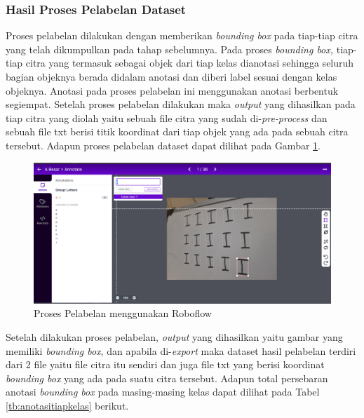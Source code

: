 \subsubsection{Hasil Proses Pelabelan Dataset}
\label{subsubsec:hasilpelabelan}

Proses pelabelan dilakukan dengan memberikan \textit{bounding box} pada tiap-tiap citra yang telah dikumpulkan pada tahap sebelumnya. Pada proses \textit{bounding box,} tiap-tiap citra yang termasuk sebagai objek dari tiap kelas dianotasi sehingga seluruh bagian objeknya berada didalam anotasi dan diberi label sesuai dengan kelas objeknya. Anotasi pada proses pelabelan ini menggunakan anotasi berbentuk segiempat. Setelah proses pelabelan dilakukan maka \textit{output} yang dihasilkan pada tiap citra yang diolah yaitu sebuah file citra yang sudah di-\textit{pre-process} dan sebuah file txt berisi titik koordinat dari tiap objek yang ada pada sebuah citra tersebut. Adapun proses pelabelan dataset dapat dilihat pada Gambar \ref{fig:labellingroboflow}. 

\begin{figure}[H]
  \centering
  \includegraphics[scale=0.39]{gambar/labelling.png}
  \caption{Proses Pelabelan menggunakan Roboflow}
  \label{fig:labellingroboflow}
\end{figure}

Setelah dilakukan proses pelabelan, \textit{output} yang dihasilkan yaitu gambar yang memiliki \textit{bounding box}, dan apabila di-\textit{export} maka dataset hasil pelabelan terdiri dari 2 file yaitu file citra itu sendiri dan juga file txt yang berisi koordinat \textit{bounding box} yang ada pada suatu citra tersebut. Adapun total persebaran anotasi \textit{bounding box} pada masing-masing kelas dapat dilihat pada Tabel \ref{tb:anotasitiapkelas} berikut. 

